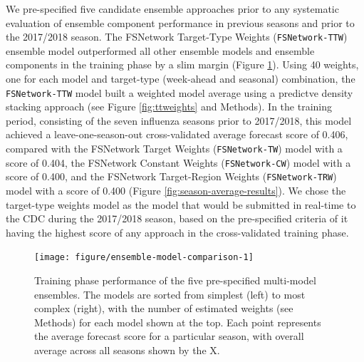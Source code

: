 \documentclass{article}\usepackage[]{graphicx}\usepackage[]{color}
\newenvironment{knitrout}{}{} %
\begin{document}
We pre-specified five candidate ensemble approaches prior to any systematic evaluation of ensemble component performance in previous seasons and prior to the 2017/2018 season.\cite{Reich2017github} 
The FSNetwork Target-Type Weights ({\tt FSNetwork-TTW}) ensemble model outperformed all other ensemble models and ensemble components in the training phase by a slim margin (Figure \ref{fig:ensemble-model-comparison}). 
Using 40 weights, one for each model and target-type (week-ahead and seasonal) combination, the {\tt FSNetwork-TTW} model built a weighted model average using a predictve density stacking approach (see Figure \ref{fig:ttweights} and Methods).
In the training period, consisting of the seven influenza seasons prior to 2017/2018, this model achieved a leave-one-season-out cross-validated average forecast score of 
0.406, 
compared with 
the FSNetwork Target Weights ({\tt FSNetwork-TW}) model with a score of 0.404, 
the FSNetwork Constant Weights ({\tt FSNetwork-CW}) model with a score of 0.400, and 
the FSNetwork Target-Region Weights ({\tt FSNetwork-TRW}) model with a score of 0.400 (Figure \ref{fig:season-average-results}).
We chose the target-type weights model as the model that would be submitted in real-time to the CDC during the 2017/2018 season, based on the pre-specified criteria of it having the highest score of any approach in the cross-validated training phase.\cite{Reich2017github}

\begin{knitrout}
\color{fgcolor}\begin{figure}
\texttt{[image: figure/ensemble-model-comparison-1]} \caption[Training phase performance of the five pre-specified multi-model ensembles]{Training phase performance of the five pre-specified multi-model ensembles. The models are sorted from simplest (left) to most complex (right), with the number of estimated weights (see Methods) for each model shown at the top. Each point represents the average forecast score for a particular season, with overall average across all seasons shown by the X. }\label{fig:ensemble-model-comparison}
\end{figure}


\end{knitrout}
\end{document}
